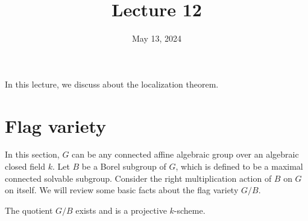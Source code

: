 





\title{Lecture 12}

\date{May 13, 2024}

\maketitle

	In this lecture, we discuss about the localization theorem.

\section{Flag variety}

	In this section, $G$ can be any connected affine algebraic group over an algebraic closed field $k$. Let $B$ be a Borel subgroup of $G$, which is defined to be a maximal connected solvable subgroup. Consider the right multiplication action of $B$ on $G$ on itself. We will review some basic facts about the flag variety $G/B$.

	\begin{thm}
		\label{thm-flag-projective}
		The quotient $G/B$ exists and is a projective $k$-scheme.
	\end{thm}

